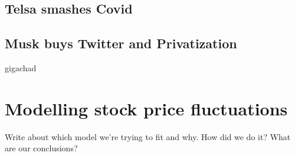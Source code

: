 \documentclass[11pt, twocolumn]{article}
\begin{document}
\begin{justify}
\subsection{Telsa smashes Covid}
\vspace{-5pt}

\subsection{Musk buys Twitter and Privatization}
gigachad
\vspace{-5pt}


\section{\large Modelling stock price fluctuations}
\vspace{-5pt}
Write about which model we're trying to fit and why. How did we do it? What are our conclusions?


\end{justify}
\end{document}
